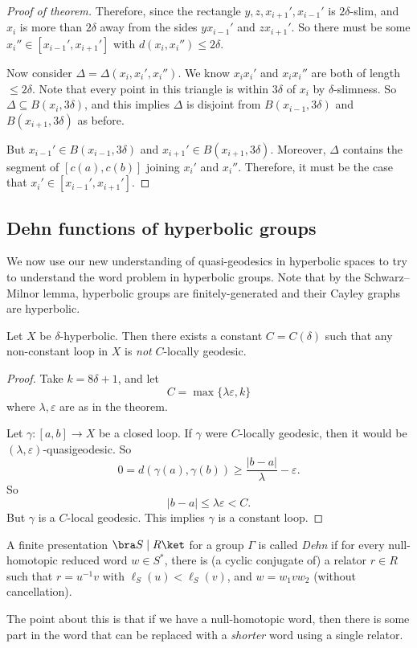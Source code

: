 \documentclass[a4paper]{article}
\begin{document}
\begin{proof}[Proof of theorem]
  Therefore, since the rectangle $y, z, x_{i + 1}', x_{i - 1}'$ is $2\delta$-slim, and $x_i$ is more than $2\delta$ away from the sides $y x_{i - 1}'$ and $z x_{i + 1}'$. So there must be some $x_i'' \in [x_{i - 1}', x_{i + 1}']$ with $d(x_i, x_i'') \leq 2 \delta$.

  Now consider $\Delta = \Delta(x_i, x_i', x_i'')$. We know $x_i x_i'$ and $x_i x_i''$ are both of length $\leq 2 \delta$. Note that every point in this triangle is within $3\delta$ of $x_i$ by $\delta$-slimness. So $\Delta \subseteq B(x_i, 3 \delta)$, and this implies $\Delta$ is disjoint from $B(x_{i - 1}, 3 \delta)$ and $B(x_{i + 1}, 3 \delta)$ as before.

  But $x_{i - 1}' \in B(x_{i - 1}, 3 \delta)$ and $x_{i + 1}' \in B(x_{i + 1}, 3\delta)$. Moreover, $\Delta$ contains the segment of $[c(a), c(b)]$ joining $x_i'$ and $x_i''$. Therefore, it must be the case that $x_i' \in [x_{i - 1}', x_{i + 1}']$.
\end{proof}

\subsection{Dehn functions of hyperbolic groups}
We now use our new understanding of quasi-geodesics in hyperbolic spaces to try to understand the word problem in hyperbolic groups. Note that by the Schwarz--Milnor lemma, hyperbolic groups are finitely-generated and their Cayley graphs are hyperbolic.

\begin{cor}
  Let $X$ be $\delta$-hyperbolic. Then there exists a constant $C = C(\delta)$ such that any non-constant loop in $X$ is \emph{not} $C$-locally geodesic.
\end{cor}

\begin{proof}
  Take $k = 8 \delta + 1$, and let
  \[
    C = \max \{\lambda \varepsilon, k\}
  \]
  where $\lambda, \varepsilon$ are as in the theorem.

  Let $\gamma: [a, b] \to X$ be a closed loop. If $\gamma$ were $C$-locally geodesic, then it would be $(\lambda, \varepsilon)$-quasigeodesic. So
  \[
    0 = d(\gamma(a), \gamma(b)) \geq \frac{|b - a|}{\lambda} - \varepsilon.
  \]
  So
  \[
    |b - a| \leq \lambda \varepsilon < C.
  \]
  But $\gamma$ is a $C$-local geodesic. This implies $\gamma$ is a constant loop.
\end{proof}

\begin{defi}
  A finite presentation $\bra S \mid R \ket$ for a group $\Gamma$ is called \emph{Dehn} if for every null-homotopic reduced word $w \in S^*$, there is (a cyclic conjugate of) a relator $r \in R$ such that $r = u^{-1}v$ with $\ell_S(u) < \ell_S(v)$, and $w = w_1 v w_2$ (without cancellation).
\end{defi}
The point about this is that if we have a null-homotopic word, then there is some part in the word that can be replaced with a \emph{shorter} word using a single relator.
\end{document}

